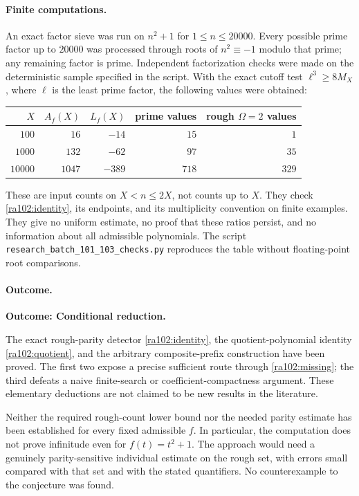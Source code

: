 \documentclass[11pt]{article}
\begin{document}
\paragraph{Finite computations.}
An exact factor sieve was run on $n^2+1$ for $1\le n\le20000$. Every possible
prime factor up to $20000$ was processed through roots of $n^2\equiv-1$
modulo that prime; any remaining factor is prime. Independent factorization
checks were made on the deterministic sample specified in the script.
With the exact cutoff test $\ell^3\ge8M_X$, where $\ell$ is the least prime
factor, the following values were obtained:
\begin{center}
\begin{tabular}{r|r r|r r}
$X$ & $A_f(X)$ & $L_f(X)$ & prime values & rough $\Omega=2$ values\\
\hline
$100$   & $16$   & $-14$  & $15$  & $1$\\
$1000$  & $132$  & $-62$  & $97$  & $35$\\
$10000$ & $1047$ & $-389$ & $718$ & $329$
\end{tabular}
\end{center}
These are input counts on $X<n\le2X$, not counts up to $X$.
They check \eqref{ra102:identity}, its endpoints, and its multiplicity
convention on finite examples. They give no uniform estimate, no proof that
these ratios persist, and no information about all admissible polynomials.
The script \texttt{research\_batch\_101\_103\_checks.py} reproduces the table
without floating-point root comparisons.

\paragraph{Outcome.}
\textbf{Outcome: Conditional reduction.}

The exact rough-parity detector \eqref{ra102:identity}, the quotient-polynomial
identity \eqref{ra102:quotient}, and the arbitrary composite-prefix construction
have been proved. The first two expose a precise sufficient route through
\eqref{ra102:missing}; the third defeats a naive finite-search or
coefficient-compactness argument. These elementary deductions are not claimed
to be new results in the literature.

Neither the required rough-count lower bound nor the needed parity estimate
has been established for every fixed admissible $f$. In particular, the
computation does not prove infinitude even for $f(t)=t^2+1$. The approach
would need a genuinely parity-sensitive individual estimate on the rough
set, with errors small compared with that set and with the stated quantifiers.
No counterexample to the conjecture was found.
\end{document}
